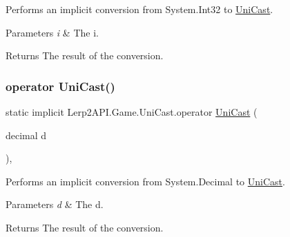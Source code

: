 Performs an implicit conversion from System.\+Int32 to \hyperlink{class_lerp2_a_p_i_1_1_game_1_1_uni_cast}{Uni\+Cast}. 


\begin{DoxyParams}{Parameters}
{\em i} & The i.\\
\hline
\end{DoxyParams}
\begin{DoxyReturn}{Returns}
The result of the conversion.
\end{DoxyReturn}
\mbox{\label{class_lerp2_a_p_i_1_1_game_1_1_uni_cast_aba4cc688c14d2d72d4e27bdc6228300d}} 
\subsubsection{\texorpdfstring{operator Uni\+Cast()}{operator UniCast()}\hspace{0.1cm}{\footnotesize\ttfamily [3/4]}}
{\footnotesize\ttfamily static implicit Lerp2\+A\+P\+I.\+Game.\+Uni\+Cast.\+operator \hyperlink{class_lerp2_a_p_i_1_1_game_1_1_uni_cast}{Uni\+Cast} (\begin{DoxyParamCaption}\item[{decimal}]{d }\end{DoxyParamCaption})\hspace{0.3cm}{\ttfamily [inline]}, {\ttfamily [static]}}



Performs an implicit conversion from System.\+Decimal to \hyperlink{class_lerp2_a_p_i_1_1_game_1_1_uni_cast}{Uni\+Cast}. 


\begin{DoxyParams}{Parameters}
{\em d} & The d.\\
\hline
\end{DoxyParams}
\begin{DoxyReturn}{Returns}
The result of the conversion.
\end{DoxyReturn}
\mbox{\label{class_lerp2_a_p_i_1_1_game_1_1_uni_cast_ae717aec495e87ed6c8c18f050c9804b6}} 

